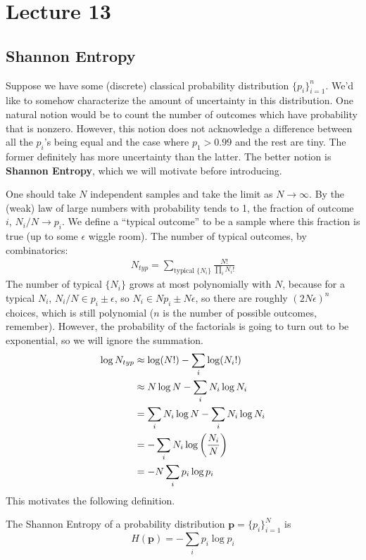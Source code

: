 \section{Lecture 13}

\subsection{Shannon Entropy}
Suppose we have some (discrete) classical probability distribution $\{p_i\}_{i = 1}^n$. We'd like to somehow
characterize the amount of uncertainty in this distribution. One natural notion would be to count the number of outcomes which
have probability that is nonzero. However, this notion does not acknowledge a difference between all the $p_i$'s being equal
and the case where $p_1 > 0.99$ and the rest are tiny. The former definitely has more uncertainty than the latter.
The better notion is \textbf{Shannon Entropy}, which we will motivate before introducing.

One should take $N$ independent samples and take the limit as $N \to \infty$. By the (weak) law of large numbers
with probability tends to 1, the fraction of outcome $i$, $N_i/N \to p_i$. We define a ``typical outcome'' to be a sample where
this fraction is true (up to some $\epsilon$ wiggle room). The number of typical outcomes, by combinatorics:
\begin{align*}
    N_{typ} = \sum_{\text{typical } \{N_i\}}\frac{N!}{\prod_{i} N_i!}
\end{align*}
The number of typical $\{N_i\}$ grows at most polynomially with $N$, because for a typical $N_i$,
$N_i/N \in p_i \pm \epsilon$, so $N_i \in Np_i \pm N \epsilon$, so there are roughly $(2N \epsilon)^n$ choices,
which is still polynomial ($n$ is the number of possible outcomes, remember). However, the probability of the factorials is
going to turn out to be exponential, so we will ignore the summation.
\begin{align*}
    \log N_{typ} &\approx \log (N!) - \sum_i \log (N_i!) \\
    &\approx N \log N - \sum_i N_i \log N_i \\
    &= \sum_i N_i \log N - \sum_i N_i \log N_i \\
    &= - \sum_i N_i \log \qty(\frac{N_i}{N}) \\
    &= - N \sum_i p_i \log p_i
\end{align*}
This motivates the following definition.

\begin{definition}
    The Shannon Entropy of a probability distribution $\mathbf{p} = \{p_i\}_{i = 1}^N$ is
    \[ H(\mathbf{p}) = -\sum_i p_i \log p_i \] 
\end{definition}

